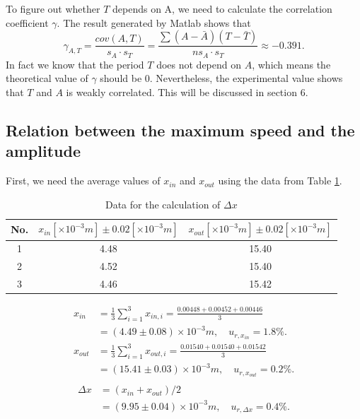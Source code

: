     To figure out whether $T$ depends on A, we need to calculate the correlation coefficient $\gamma$. The result generated by Matlab shows that
    \[
        \gamma_{A,T}=\frac{cov(A,T)}{s_A\cdot s_T}=\frac{\sum(A-\bar{A})(T-\bar{T})}{ns_A\cdot s_T}\approx -0.391.
    \]
    In fact we know that the period $T$ does not depend on $A$, which means the theoretical value of $\gamma$ should be $0$. Nevertheless, the experimental value shows that $T$ and $A$ is weakly correlated. This will be discussed in section 6.

\subsection{Relation between the maximum speed and the amplitude}
    First, we need the average values of $x_{in}$ and $x_{out}$ using the data from Table \ref{x}.
    \begin{table}[h] \small
        \centering
        \begin{tabular}{|c|c|c|}
            \hline
            No. & $x_{in}[\times10^{-3}m]\pm 0.02[\times10^{-3}m]$ & $x_{out}[\times10^{-3}m]\pm 0.02[\times10^{-3}m]$\\ \hline
            1 & 4.48 & 15.40\\ \hline
            2 & 4.52 & 15.40\\ \hline
            3 & 4.46 & 15.42\\ \hline
        \end{tabular}
        \caption{Data for the calculation of $\Delta x$}\label{x}
    \end{table}
    \[
    \begin{split}
        x_{in}&=\frac{1}{3}\sum_{i=1}^{3}x_{in,i}=\frac{0.00448+0.00452+0.00446}{3}\\
        &=(4.49\pm0.08)\times10^{-3}m,\quad u_{r,x_{in}}=1.8\%.\\[0.4cm]
        x_{out}&=\frac{1}{3}\sum_{i=1}^{3}x_{out,i}=\frac{0.01540+0.01540+0.01542}{3}\\
        &=(15.41\pm0.03)\times10^{-3}m,\quad u_{r,x_{out}}=0.2\%.\\
    \end{split}
    \]
    \[
    \begin{split}
        \Delta x&=(x_{in}+x_{out})/2\\
        &=(9.95\pm0.04)\times10^{-3}m,\quad u_{r,\Delta x}=0.4\%.
    \end{split}
    \]


